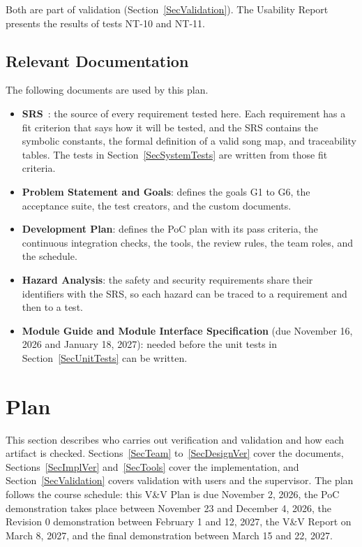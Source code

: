 \documentclass[12pt, titlepage]{article}
\begin{document}
Both are part of validation (Section~\ref{SecValidation}). The Usability Report
presents the results of tests NT-10 and NT-11.

\subsection{Relevant Documentation}

The following documents are used by this plan.

\begin{itemize}
  \item \textbf{SRS}~\citep{SRS}: the source of every requirement tested here.
        Each requirement has a fit criterion that says how it will be tested,
        and the SRS contains the symbolic constants, the formal definition of a
        valid song map, and traceability tables. The tests in
        Section~\ref{SecSystemTests} are written from those fit criteria.
  \item \textbf{Problem Statement and Goals}: defines the goals G1 to G6, the
        acceptance suite, the test creators, and the custom documents.
  \item \textbf{Development Plan}: defines the PoC plan with its pass criteria,
        the continuous integration checks, the tools, the review rules, the
        team roles, and the schedule.
  \item \textbf{Hazard Analysis}: the safety and security requirements share
        their identifiers with the SRS, so each hazard can be traced to a
        requirement and then to a test.
  \item \textbf{Module Guide and Module Interface Specification} (due
        November 16, 2026 and January 18, 2027): needed before the unit tests
        in Section~\ref{SecUnitTests} can be written.
\end{itemize}

\section{Plan} \label{SecPlan}

This section describes who carries out verification and validation and how
each artifact is checked. Sections~\ref{SecTeam} to~\ref{SecDesignVer} cover the
documents, Sections~\ref{SecImplVer} and~\ref{SecTools} cover the
implementation, and Section~\ref{SecValidation} covers validation with users
and the supervisor. The plan follows the course schedule: this V\&V Plan is due
November 2, 2026, the PoC demonstration takes place between November 23 and
December 4, 2026, the Revision 0 demonstration between February 1 and 12, 2027,
the V\&V Report on March 8, 2027, and the final demonstration between March 15
and 22, 2027.
\end{document}
